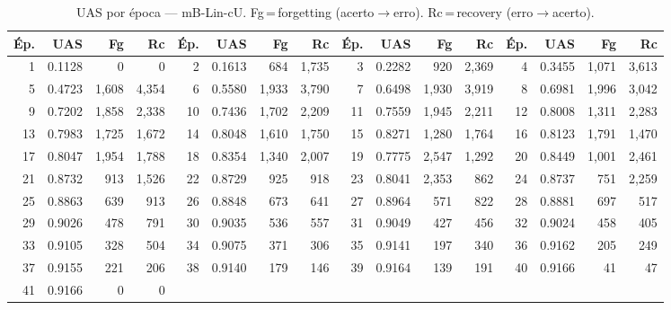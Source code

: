 \begin{table}[ht]
\centering\scriptsize
\caption{UAS por época --- mB-Lin-cU. Fg\,=\,forgetting (acerto$\to$erro). Rc\,=\,recovery (erro$\to$acerto).}
\label{tab:uas-predictions-results-mbert-linear}
\begin{tabular}{rrrr rrrr rrrr rrrr}
\toprule
\textbf{Ép.} & \textbf{UAS} & \textbf{Fg} & \textbf{Rc} & \textbf{Ép.} & \textbf{UAS} & \textbf{Fg} & \textbf{Rc} & \textbf{Ép.} & \textbf{UAS} & \textbf{Fg} & \textbf{Rc} & \textbf{Ép.} & \textbf{UAS} & \textbf{Fg} & \textbf{Rc} \\
\midrule
1 & 0.1128 & 0 & 0 & 2 & 0.1613 & 684 & 1,735 & 3 & 0.2282 & 920 & 2,369 & 4 & 0.3455 & 1,071 & 3,613 \\
5 & 0.4723 & 1,608 & 4,354 & 6 & 0.5580 & 1,933 & 3,790 & 7 & 0.6498 & 1,930 & 3,919 & 8 & 0.6981 & 1,996 & 3,042 \\
9 & 0.7202 & 1,858 & 2,338 & 10 & 0.7436 & 1,702 & 2,209 & 11 & 0.7559 & 1,945 & 2,211 & 12 & 0.8008 & 1,311 & 2,283 \\
13 & 0.7983 & 1,725 & 1,672 & 14 & 0.8048 & 1,610 & 1,750 & 15 & 0.8271 & 1,280 & 1,764 & 16 & 0.8123 & 1,791 & 1,470 \\
17 & 0.8047 & 1,954 & 1,788 & 18 & 0.8354 & 1,340 & 2,007 & 19 & 0.7775 & 2,547 & 1,292 & 20 & 0.8449 & 1,001 & 2,461 \\
21 & 0.8732 & 913 & 1,526 & 22 & 0.8729 & 925 & 918 & 23 & 0.8041 & 2,353 & 862 & 24 & 0.8737 & 751 & 2,259 \\
25 & 0.8863 & 639 & 913 & 26 & 0.8848 & 673 & 641 & 27 & 0.8964 & 571 & 822 & 28 & 0.8881 & 697 & 517 \\
29 & 0.9026 & 478 & 791 & 30 & 0.9035 & 536 & 557 & 31 & 0.9049 & 427 & 456 & 32 & 0.9024 & 458 & 405 \\
33 & 0.9105 & 328 & 504 & 34 & 0.9075 & 371 & 306 & 35 & 0.9141 & 197 & 340 & 36 & 0.9162 & 205 & 249 \\
37 & 0.9155 & 221 & 206 & 38 & 0.9140 & 179 & 146 & 39 & 0.9164 & 139 & 191 & 40 & 0.9166 & 41 & 47 \\
41 & 0.9166 & 0 & 0 &  & & &  &  & & &  &  & & &  \\
\bottomrule
\end{tabular}
\end{table}
